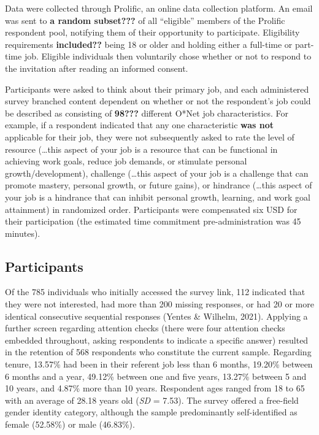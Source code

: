 \documentclass[
  man,mask]{apa7}
\begin{document}
Data were collected through Prolific, an online data collection platform. An email was sent to \textbf{a random subset???} of all ``eligible'' members of the Prolific respondent pool, notifying them of their opportunity to participate. Eligibility requirements \textbf{included??} being 18 or older and holding either a full-time or part-time job. Eligible individuals then voluntarily chose whether or not to respond to the invitation after reading an informed consent.

Participants were asked to think about their primary job, and each administered survey branched content dependent on whether or not the respondent's job could be described as consisting of \textbf{98???} different O*Net job characteristics. For example, if a respondent indicated that any one characteristic \textbf{was not} applicable for their job, they were not subsequently asked to rate the level of resource (\ldots this aspect of your job is a resource that can be functional in achieving work goals, reduce job demands, or stimulate personal growth/development), challenge (\ldots this aspect of your job is a challenge that can promote mastery, personal growth, or future gains), or hindrance (\ldots this aspect of your job is a hindrance that can inhibit personal growth, learning, and work goal attainment) in randomized order. Participants were compensated six USD for their participation (the estimated time commitment pre-administration was 45 minutes).

\hypertarget{participants}{%
\subsection{Participants}\label{participants}}

Of the 785 individuals who initially accessed the survey link, 112 indicated that they were not interested, had more than 200 missing responses, or had 20 or more identical consecutive sequential responses (Yentes \& Wilhelm, 2021). Applying a further screen regarding attention checks (there were four attention checks embedded throughout, asking respondents to indicate a specific answer) resulted in the retention of 568 respondents who constitute the current sample. Regarding tenure, 13.57\% had been in their referent job less than 6 months, 19.20\% between 6 months and a year, 49.12\% between one and five years, 13.27\% between 5 and 10 years, and 4.87\% more than 10 years. Respondent ages ranged from 18 to 65 with an average of 28.18 years old (\emph{SD} = 7.53). The survey offered a free-field gender identity category, although the sample predominantly self-identified as female (52.58\%) or male (46.83\%).
\end{document}
